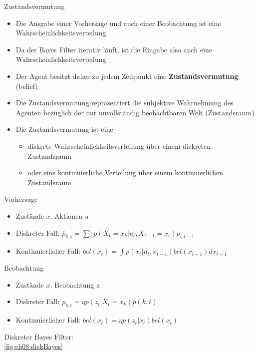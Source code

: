 Zustandsvermutung
\begin{itemize}
	\item Die Ausgabe einer Vorhersage und auch einer Beobachtung ist eine Wahrscheinlichkeitsverteilung
	\item Da der Bayes Filter iterativ l\"auft, ist die Eingabe also auch eine Wahrscheinlichkeitsverteilung
	\item Der Agent besitzt daher zu jedem Zeitpunkt eine \textbf{Zustandsvermutung} (belief)
	\item Die Zustandsvermutung repr\"asentiert die subjektive Wahrnehmung des Agenten bez\"uglich der nur unvollst\"andig beobachtbaren Welt (Zustandsraum)
	\item Die Zustandsvermutung ist eine
	\begin{itemize}
		\item diskrete Wahrscheinlichkeitsverteilung \"uber einem diskreten Zustandsraum
		\item oder eine kontinuierliche Verteilung \"uber einem kontinuierlichen Zustandsraum
	\end{itemize}
\end{itemize}

Vorhersage
\begin{itemize}
	\item Zust\"ande $x$, Aktionen $u$
	\item Diskreter Fall: $\overline{p}_{k,t} = \sum_i p(X_t = x_k | u_t, X_{t-1} = x_i)p_{i, t-1}$
	\item Kontinuierlicher Fall: $\overline{bel}(x_t) = \int p(x_t | u_t, x_{t-1}) bel(x_{t-1})dx_{t-1}$
\end{itemize}

Beobachtung
\begin{itemize}
	\item Zust\"ande $x$, Beobachtung $z$
	\item Diskreter Fall: $p_{k,t} = \eta p(z_t | X_t = x_k) \overline{p}(k,t)$
	\item Kontinuierlicher Fall: $bel(x_t) = \eta p(z_t | x_t) \overline{bel}(x_t)$
\end{itemize}

Diskreter Bayes Filter:\\
\autoref{fig:ch08:diskBayes}

